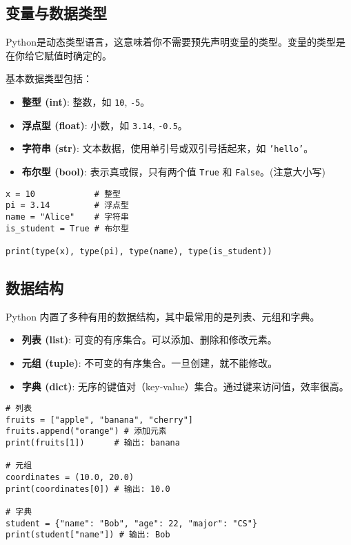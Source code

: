 \documentclass[UTF8]{gyh}
\begin{document}
\subsection{变量与数据类型}
Python是动态类型语言，这意味着你不需要预先声明变量的类型。变量的类型是在你给它赋值时确定的。

基本数据类型包括：
\begin{itemize}
    \item \textbf{整型 (int)}: 整数，如 \texttt{10}, \texttt{-5}。
    \item \textbf{浮点型 (float)}: 小数，如 \texttt{3.14}, \texttt{-0.5}。
    \item \textbf{字符串 (str)}: 文本数据，使用单引号或双引号括起来，如 \texttt{'hello'}。
    \item \textbf{布尔型 (bool)}: 表示真或假，只有两个值 \texttt{True} 和 \texttt{False}。(注意大小写)
\end{itemize}

\begin{lstlisting}
x = 10            # 整型
pi = 3.14         # 浮点型
name = "Alice"    # 字符串
is_student = True # 布尔型

print(type(x), type(pi), type(name), type(is_student))
\end{lstlisting}

\subsection{数据结构}
Python 内置了多种有用的数据结构，其中最常用的是列表、元组和字典。
\begin{itemize}
    \item \textbf{列表 (list)}: 可变的有序集合。可以添加、删除和修改元素。
    \item \textbf{元组 (tuple)}: 不可变的有序集合。一旦创建，就不能修改。
    \item \textbf{字典 (dict)}: 无序的键值对（key-value）集合。通过键来访问值，效率很高。
\end{itemize}

\begin{lstlisting}
# 列表
fruits = ["apple", "banana", "cherry"]
fruits.append("orange") # 添加元素
print(fruits[1])      # 输出: banana

# 元组
coordinates = (10.0, 20.0)
print(coordinates[0]) # 输出: 10.0

# 字典
student = {"name": "Bob", "age": 22, "major": "CS"}
print(student["name"]) # 输出: Bob
\end{lstlisting}
\end{document}
